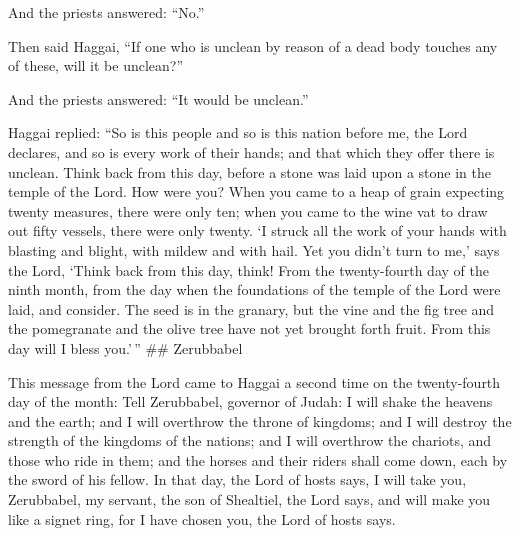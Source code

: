 And the priests answered: ``No.''

 Then said Haggai, ``If one who is unclean by reason of a
dead body touches any of these, will it be unclean?''

And the priests answered: ``It would be unclean.''

 Haggai replied: ``So is this people and so is this nation
before me, the Lord declares, and so is every work of their hands; and
that which they offer there is unclean.  Think back from
this day, before a stone was laid upon a stone in the temple of the
Lord.  How were you? When you came to a heap of grain
expecting twenty measures, there were only ten; when you came to the
wine vat to draw out fifty vessels, there were only twenty.
 `I struck all the work of your hands with blasting and
blight, with mildew and with hail. Yet you didn't turn to me,' says the
Lord,  `Think back from this day, think! From the
twenty-fourth day of the ninth month, from the day when the foundations
of the temple of the Lord were laid, and consider.  The
seed is in the granary, but the vine and the fig tree and the
pomegranate and the olive tree have not yet brought forth fruit. From
this day will I bless you.'\,'' \#\# Zerubbabel

 This message from the Lord came to Haggai a second time on
the twenty-fourth day of the month:  Tell Zerubbabel,
governor of Judah: I will shake the heavens and the earth; 
and I will overthrow the throne of kingdoms; and I will destroy the
strength of the kingdoms of the nations; and I will overthrow the
chariots, and those who ride in them; and the horses and their riders
shall come down, each by the sword of his fellow.  In that
day, the Lord of hosts says, I will take you, Zerubbabel, my servant,
the son of Shealtiel, the Lord says, and will make you like a signet
ring, for I have chosen you, the Lord of hosts says.
